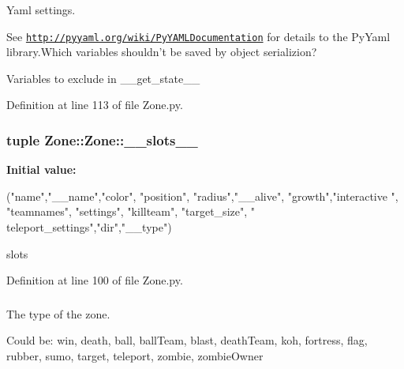\-Yaml settings. 

\-See \href{http://pyyaml.org/wiki/PyYAMLDocumentation}{\tt http\-://pyyaml.\-org/wiki/\-Py\-Y\-A\-M\-L\-Documentation} for details to the \-Py\-Yaml library.\-Which variables shouldn't be saved by object serializion?

\-Variables to exclude in \-\_\-\-\_\-get\-\_\-state\-\_\-\-\_\- 

\-Definition at line 113 of file \-Zone.\-py.

\hypertarget{class_zone_1_1_zone_ad7d13498103aed8ebf8f3bb4e3344167}{
\subsubsection[{\-\_\-\-\_\-slots\-\_\-\-\_\-}]{\setlength{\rightskip}{0pt plus 5cm}tuple {\bf \-Zone\-::\-Zone\-::\-\_\-\-\_\-slots\-\_\-\-\_\-}}}
\label{class_zone_1_1_zone_ad7d13498103aed8ebf8f3bb4e3344167}
{\bfseries \-Initial value\-:}
\begin{DoxyCode}
("name","__name","color", "position", "radius","__alive", "growth","interactive
      ", 
              "teamnames", "settings", "killteam", "target_size", "
      teleport_settings","dir","__type")
\end{DoxyCode}


slots 



\-Definition at line 100 of file \-Zone.\-py.

\hypertarget{class_zone_1_1_zone_a8330fbba60783f55e3cf63a6207744f1}{
\subsubsection[{\-\_\-\-\_\-type}]{}}
\label{class_zone_1_1_zone_a8330fbba60783f55e3cf63a6207744f1}


\-The type of the zone. 

\-Could be\-: win, death, ball, ball\-Team, blast, death\-Team, koh, fortress, flag, rubber, sumo, target, teleport, zombie, zombie\-Owner 

